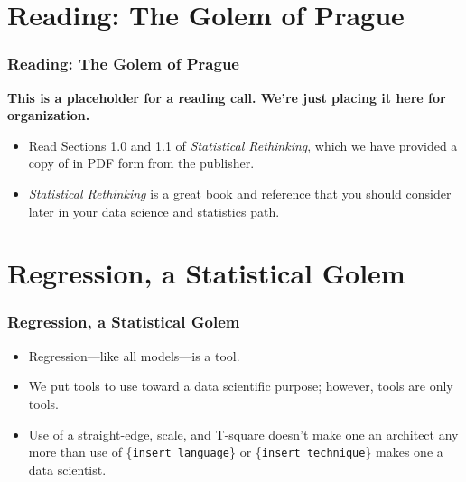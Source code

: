 \documentclass[12pt, block=fill]{beamer}
\begin{document}
\section{Reading: The Golem of Prague}

\begin{frame}
  \frametitle{Reading: The Golem of Prague}
  \textbf{This is a placeholder for a reading call. We're just placing
    it here for organization.} 
  \begin{itemize}
  \item Read Sections 1.0 and 1.1 of \textit{Statistical Rethinking},
    which we have provided a copy of in PDF form from the publisher.
  \item \textit{Statistical Rethinking} is a great book and reference
    that you should consider later in your data science and statistics
    path.
  \end{itemize}
\end{frame}

\section{Regression, a Statistical Golem}

\begin{frame}
  \frametitle{Regression, a Statistical Golem}
  \begin{itemize}
  \item Regression—like all models—is a tool. 
  \item We put tools to use toward a data scientific purpose; however,
    tools are only tools.
  \item Use of a straight-edge, scale, and T-square doesn't make
    one an architect any more than use of \{\texttt{insert language}\}
    or \{\texttt{insert technique}\} makes one a data scientist. 
  \end{itemize}
    
\end{frame}
\end{document}
